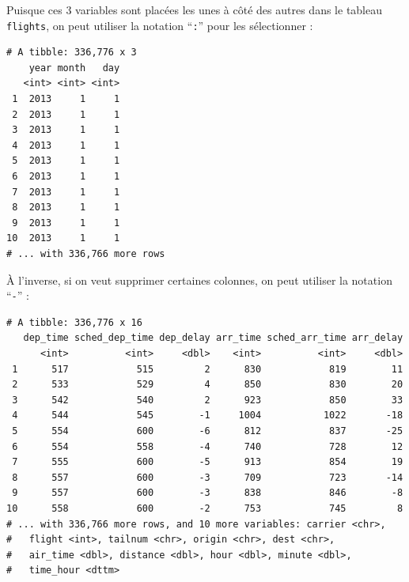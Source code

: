 \documentclass[a4paperpaper,]{article}
\newenvironment{Shaded}{\begin{snugshade}}{\end{snugshade}}
\newcommand{\CommentTok}[1]{\textcolor[rgb]{0.54,0.53,0.53}{#1}}
\newcommand{\KeywordTok}[1]{\textcolor[rgb]{0.12,0.11,0.11}{\textbf{#1}}}
\newcommand{\NormalTok}[1]{\textcolor[rgb]{0.12,0.11,0.11}{#1}}
\newcommand{\OperatorTok}[1]{\textcolor[rgb]{0.12,0.11,0.11}{#1}}
\newcommand{\StringTok}[1]{\textcolor[rgb]{0.75,0.01,0.01}{#1}}
\begin{document}
Puisque ces 3 variables sont placées les unes à côté des autres dans le tableau \texttt{flights}, on peut utiliser la notation ``\texttt{:}'' pour les sélectionner :

\begin{Shaded}
\end{Shaded}

\begin{verbatim}
# A tibble: 336,776 x 3
    year month   day
   <int> <int> <int>
 1  2013     1     1
 2  2013     1     1
 3  2013     1     1
 4  2013     1     1
 5  2013     1     1
 6  2013     1     1
 7  2013     1     1
 8  2013     1     1
 9  2013     1     1
10  2013     1     1
# ... with 336,766 more rows
\end{verbatim}

À l'inverse, si on veut supprimer certaines colonnes, on peut utiliser la notation ``\texttt{-}'' :

\begin{Shaded}
\end{Shaded}

\begin{verbatim}
# A tibble: 336,776 x 16
   dep_time sched_dep_time dep_delay arr_time sched_arr_time arr_delay
      <int>          <int>     <dbl>    <int>          <int>     <dbl>
 1      517            515         2      830            819        11
 2      533            529         4      850            830        20
 3      542            540         2      923            850        33
 4      544            545        -1     1004           1022       -18
 5      554            600        -6      812            837       -25
 6      554            558        -4      740            728        12
 7      555            600        -5      913            854        19
 8      557            600        -3      709            723       -14
 9      557            600        -3      838            846        -8
10      558            600        -2      753            745         8
# ... with 336,766 more rows, and 10 more variables: carrier <chr>,
#   flight <int>, tailnum <chr>, origin <chr>, dest <chr>,
#   air_time <dbl>, distance <dbl>, hour <dbl>, minute <dbl>,
#   time_hour <dttm>
\end{verbatim}
\end{document}
